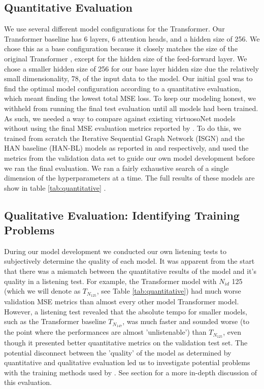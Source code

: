 \subsection{Quantitative Evaluation}
We use several different model configurations for the Transformer. Our Transformer baseline has 6 layers, 6 attention heads, and a hidden size of 256. We chose this as a base configuration because it closely matches the size of the original Transformer \cite{vaswani2017attention}, except for the hidden size of the feed-forward layer. We chose a smaller hidden size of 256 for our base layer hidden size due the relatively small dimensionality, 78, of the input data to the model. Our initial goal was to find the optimal model configuration according to a quantitative evaluation, which meant finding the lowest total MSE loss. To keep our modeling honest, we withheld from running the final test evaluation until all models had been trained. As such, we needed a way to compare against existing virtuosoNet models without using the final MSE evaluation metrics reported by \citet{jeong2019virtuosonet}. To do this, we trained from scratch the Iterative Sequential Graph Network (ISGN) and the HAN baseline (HAN-BL) models as reported in \cite{jeong2019graph} and \cite{jeong2019virtuosonet} respectively, and used the metrics from the validation data set to guide our own model development before we ran the final evaluation. We ran a fairly exhaustive search of a single dimension of the hyperparameters at a time. The full results of these models are show in table \ref{tab:quantitative} . 

\newcommand{\tm}[1]{$T_{N_{#1}}$}

\subsection{Qualitative Evaluation: Identifying Training Problems}\label{sec:qualitative-eval-problems}
During our model development we conducted our own listening tests to subjectively determine the quality of each model. It was apparent from the start that there was a mismatch between the quantitative results of the model and it's quality in a listening test. For example, the Transformer model with $N_{id}$ 125 (which we will denote as \tm{125}, see Table \ref{tab:quantitative}) had much worse validation MSE metrics than almost every other model Transformer model. However, a listening test revealed that the absolute tempo for smaller models, such as the Transformer baseline \tm{147}, was much faster and sounded worse (to the point where the performances are almost 'unlistenable') than \tm{125}, even though it presented better quantitative metrics on the validation test set. The potential disconnect between the 'quality' of the model as determined by quantitative and qualitative evaluation led us to investigate potential problems with the training methods used by \citet{jeong2019virtuosonet}. See section  for a more in-depth discussion of this evaluation. 

